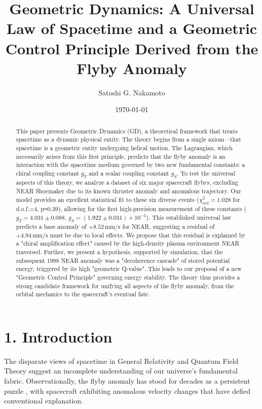 \documentclass[aps,prl,twocolumn,superscriptaddress,longbibliography,floatfix]{revtex4-2}
\begin{document}
\title{Geometric Dynamics: A Universal Law of Spacetime and a Geometric Control Principle Derived from the Flyby Anomaly}

\author{Satoshi G. Nakamoto}

\date{\today}

\begin{abstract}
This paper presents Geometric Dynamics (GD), a theoretical framework that treats spacetime as a dynamic physical entity. The theory begins from a single axiom—that spacetime is a geometric entity undergoing helical motion. The Lagrangian, which necessarily arises from this first principle, predicts that the flyby anomaly is an interaction with the spacetime medium governed by two new fundamental constants: a chiral coupling constant $g_T$ and a scalar coupling constant $g_S$. To test the universal aspects of this theory, we analyze a dataset of six major spacecraft flybys, excluding NEAR Shoemaker due to its known thruster anomaly and anomalous trajectory. Our model provides an excellent statistical fit to these six diverse events ($\chi^2_{\text{red}} = 1.028$ for d.o.f.=4, p≈0.39), allowing for the first high-precision measurement of these constants ($g_T = 4.031 \pm 0.088$, $g_S = (1.922 \pm 0.031) \times 10^{-5}$). This established universal law predicts a base anomaly of $+8.52 \, \text{mm/s}$ for NEAR, suggesting a residual of $+4.94 \, \text{mm/s}$ must be due to local effects. We propose that this residual is explained by a "chiral amplification effect" caused by the high-density plasma environment NEAR traversed. Further, we present a hypothesis, supported by simulation, that the subsequent 1998 NEAR anomaly was a "decoherence cascade" of stored potential energy, triggered by its high "geometric Q-value". This leads to our proposal of a new "Geometric Control Principle" governing energy stability. The theory thus provides a strong candidate framework for unifying all aspects of the flyby anomaly, from the orbital mechanics to the spacecraft's eventual fate.
\end{abstract}

\maketitle

\section{1. Introduction}
The disparate views of spacetime in General Relativity and Quantum Field Theory suggest an incomplete understanding of our universe's fundamental fabric. Observationally, the flyby anomaly has stood for decades as a persistent puzzle \cite{Anderson2008}, with spacecraft exhibiting anomalous velocity changes that have defied conventional explanation.
\end{document}
